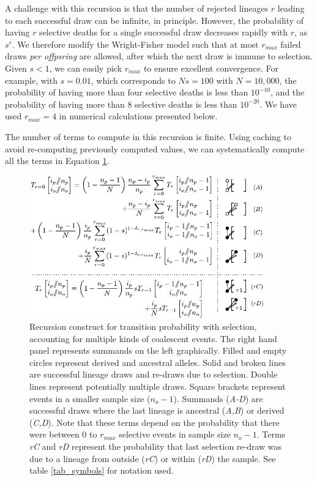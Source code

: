 \documentclass[review,nonatbib]{elsarticle}
\begin{document}
A challenge with this recursion is that the number of rejected lineages $r$ leading to each successful 
draw can be infinite, in principle.
 However, the probability of having $r$ selective deaths for a single successful draw decreases
rapidly with $r$, as $s^r.$ We therefore modify the Wright-Fisher model such that at most $r_{max}$ failed
draws \emph{per offpsring} are allowed, after which the next draw is immune to selection. Given
$s<1$, we can easily pick $r_{max}$ to ensure excellent convergence. For example, with $s=0.01$, 
which corresponds to $Ns=100$ with $N=10,000$, the probability of having more than 
four selective deaths is less than $10^{-10}$, and the probability of having more than 8 selective deaths is 
less than $10^{-20}.$ We have used $r_{max}=4$ in numerical calculations presented below. 

The number of terms to compute in this recursion is finite. Using caching to avoid re-computing previously computed values,
we can systematically compute all the terms in Equation \ref{fig_rec_selection_dynamic_fail}.

\begin{figure}
  \centering
  \includegraphics[width=0.9\textwidth]{fig/recurrence-selection-dynamic-failures-annotated.pdf}

  \caption{Recursion construct for transition probability with selection, accounting for multiple
    kinds of coalescent events. The right hand panel represents summands on the left graphically.
    Filled and empty circles represent derived and ancestral alleles. Solid and broken lines are
    successful lineage draws and re-draws due to selection. Double lines represent potentially
    multiple draws. Square brackets represent events in a smaller sample size ($n_o-1$). Summands
    (\textit{A-D}) are successful draws where the last lineage is ancestral (\textit{A,B}) or
    derived (\textit{C,D}). Note that these terms depend on the probability that there were between
    $0$ to $r_{max}$ selective events in sample size $n_o-1$. Terms \textit{rC} and \textit{rD}
    represent the probability that last selection re-draw was due to a lineage from outside
    (\textit{rC}) or within (\textit{rD}) the sample. See table \ref{tab_symbols} for notation used.
  }

  \label{fig_rec_selection_dynamic_fail}
\end{figure}
 
\end{document}
